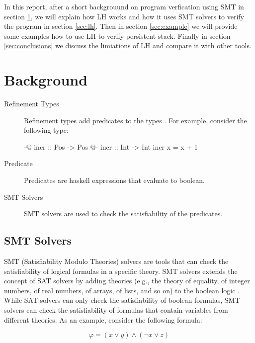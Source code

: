 \documentclass[]{rptuseminar}
\begin{document}
In this report, after a short backgrouund on program verfication using SMT in section \ref{sec:background}, we will explain 
how LH works and how it uses SMT solvers to 
verify the program in section \ref{sec:lh}. Then in section \ref{sec:example} we will provide some examples how to use 
LH to verify persistent stack. Finally in section \ref{sec:conclusions} we 
discuss the limiations of LH and compare it with other tools.


\section{Background}
\label{sec:background}
\begin{description}
  \item[Refinement Types] Refinement types add predicates to the types \cite{jhala_programming_2020}. For example, consider the following type:


    \begin{haskell}
      {-@ incr :: Pos -> Pos @-}
      incr :: Int -> Int
      incr x = x + 1
    \end{haskell}

  \item[Predicate] Predicates are haskell expressions that evaluate to boolean.
  \item[SMT Solvers] SMT solvers are used to check the satisfiability of the predicates. 
  
\end{description}
\subsection{SMT Solvers}
SMT (Satisfiability Modulo Theories) solvers are tools that can check the satisfiability of logical formulas in a specific theory.
SMT solvers extends the concept of SAT solvers by adding theories (e.g., the theory of equality, 
of integer numbers, of real numbers, of arrays, of lists, and so on) to the boolean logic \cite{clarke_satisfiability_2018}.
While SAT solvers can only check the satisfiability of boolean formulas, SMT solvers can check the satisfiability of formulas 
that contain variables from different theories. 
As an example, consider the following formula:

\begin{equation}
  \varphi = (x \lor y) \land (\lnot x \lor z)
\end{equation}
\end{document}
